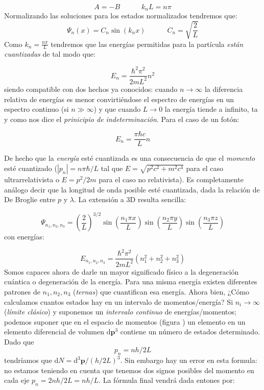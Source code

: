 \documentclass[12pt]{article}
\newcommand{\parentesis}[1]{\left( #1  \right)}
\newcommand{\D}{\mathrm{d}}
\newcommand{\tquad}{\quad \quad \quad}
\newcommand{\pn}{\mathbf{p}}
\begin{document}
\begin{equation}
A =  - B \tquad k_n L = n \pi
\end{equation}
Normalizando las soluciones para los estados normalizados tendremos que:
\begin{equation}
\Psi_n (x) = C_n \sin (k_n x) \tquad C_n = \sqrt{\frac{2}{L}}
\end{equation}
Como $k_n = \frac{n \pi}{L}$ tendremos que las energías permitidas para la partícula \textit{están cuantizadas} de tal modo que:

\begin{equation}
E_n = \frac{\hbar^2 \pi^2}{2m L^2} n^2
\end{equation}
siendo compatible con dos hechos ya conocidos: cuando $n \rightarrow \infty$ la diferencia relativa de energías es menor convirtiéndose el espectro de energías en un espectro continuo (si $n \gg \infty$) y que cuando $L\rightarrow 0$ la energía tiende a infinito, ta y como nos dice el \textit{prinicipio de indeterminación}. Para el caso de un fotón:

\begin{equation}
E_n = \frac{\pi \hbar c}{L} n
\end{equation}

De hecho que la \textit{energía} esté cuantizada es una consecuencia de que el \textit{momento} esté cuantizado ($|p_n| = n \pi \hbar /L$ tal que $E = \sqrt{p^2 c^2 + m^2 c^4}$ para el caso ultrarrelativista o $E = p^2 /2m$ para el caso no relativista). Es completamente análogo decir que la longitud de onda posible esté cuantizada, dada la relación de De Broglie entre $p$ y $\lambda$. La extensión a 3D resulta sencilla:

\begin{equation}
\Psi_{n_1,n_2,n_3} = \parentesis{\dfrac{2}{L}}^{3/2} \sin \parentesis{\frac{n_1 \pi x}{L}}\sin \parentesis{\frac{n_2 \pi y}{L}} \sin \parentesis{\frac{n_3 \pi z}{L}}
\end{equation}
con energías:

\begin{equation}
E_{n_1,n_2,n_3} = \frac{\hbar^2 \pi^2}{2m L^2} \parentesis{n_1^2+n_2^2+n_3^2}
\end{equation}
Somos capaces ahora de darle un mayor significado físico a la degeneración cuántica o degeneración de la energía. Para una misma energía existen diferentes patrones de $n_1,n_2,n_3$ (\textit{ternas}) que cuantifican esa energía. Ahora bien, ¿Cómo calculamos cuantos estados hay en un intervalo de momentos/energía? Si $n_i \rightarrow \infty$ (\textit{límite clásico}) y suponemos un \textit{intervalo continuo} de energías/momentos; podemos suponer que en el espacio de momentos (figura ) un elemento en un elemento diferencial de volumen $\D \pn^3$ contiene un número de estados determinado. Dado que $$ p_n = n h / 2 L $$ tendríamos que $ \D N  = \D^3 \pn / ( h/2L)^3 $. Sin embargo hay un error en esta formula: no estamos teniendo en cuenta que tenemos dos signos posibles del momento en cada eje $p_n = 2 n h /2 L = n h /L$. La fórmula final vendrá dada entones por:
\end{document}
